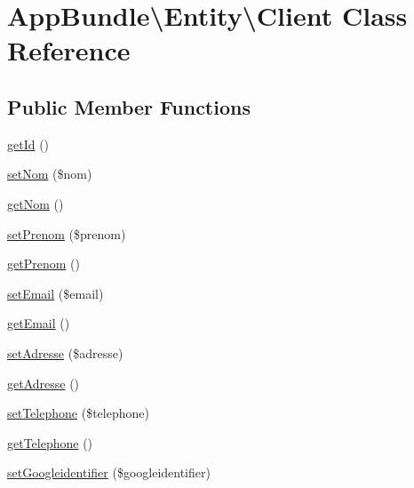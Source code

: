 \hypertarget{class_app_bundle_1_1_entity_1_1_client}{}\section{App\+Bundle\textbackslash{}Entity\textbackslash{}Client Class Reference}
\label{class_app_bundle_1_1_entity_1_1_client}
\subsection*{Public Member Functions}
\begin{DoxyCompactItemize}
\item 
\hyperlink{class_app_bundle_1_1_entity_1_1_client_af4fd6c5d47e9f2b1a302c6eb7e437ee8}{get\+Id} ()
\item 
\hyperlink{class_app_bundle_1_1_entity_1_1_client_aec8368cf77fcb71653d5ae4febdd782e}{set\+Nom} (\$nom)
\item 
\hyperlink{class_app_bundle_1_1_entity_1_1_client_a6705d8eb6ed7a4a1cb35be05ccf1a6e4}{get\+Nom} ()
\item 
\hyperlink{class_app_bundle_1_1_entity_1_1_client_aa2a558c160b6bccb977de5c13336899b}{set\+Prenom} (\$prenom)
\item 
\hyperlink{class_app_bundle_1_1_entity_1_1_client_ad8dea1187e563bbe5cddbbe1ff7d792b}{get\+Prenom} ()
\item 
\hyperlink{class_app_bundle_1_1_entity_1_1_client_a4a91f39255a5fc19f73760f4c675e886}{set\+Email} (\$email)
\item 
\hyperlink{class_app_bundle_1_1_entity_1_1_client_a66b2ce121d5c6a4376eb65bb06c8b60f}{get\+Email} ()
\item 
\hyperlink{class_app_bundle_1_1_entity_1_1_client_a06e8d1cbc1734161ab944cfefaa3ae85}{set\+Adresse} (\$adresse)
\item 
\hyperlink{class_app_bundle_1_1_entity_1_1_client_a5723a5d28f0c6744ff4e5ec2b4b7624a}{get\+Adresse} ()
\item 
\hyperlink{class_app_bundle_1_1_entity_1_1_client_a7ed3d6dde97dc36572ecd115fa50523d}{set\+Telephone} (\$telephone)
\item 
\hyperlink{class_app_bundle_1_1_entity_1_1_client_a6d56a554ffdbcece09418ec7306edd35}{get\+Telephone} ()
\item 
\hyperlink{class_app_bundle_1_1_entity_1_1_client_a2447045598aab2e13a42871d674dd0be}{set\+Googleidentifier} (\$googleidentifier)
\item 

\end{DoxyCompactItemize}

